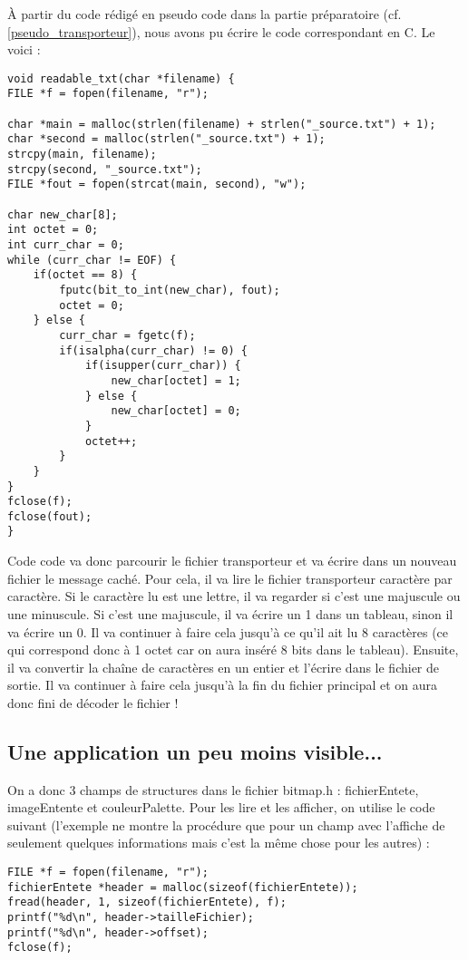 \documentclass[12pt]{article}
\begin{document}
À partir du code rédigé en pseudo code dans la partie préparatoire (cf. \ref{pseudo_transporteur}), nous avons pu écrire le code correspondant en C. Le voici :
\begin{lstlisting}[style=languageClarge, caption=Code décodage fichier txt]
void readable_txt(char *filename) {
FILE *f = fopen(filename, "r");

char *main = malloc(strlen(filename) + strlen("_source.txt") + 1);
char *second = malloc(strlen("_source.txt") + 1);
strcpy(main, filename);
strcpy(second, "_source.txt");
FILE *fout = fopen(strcat(main, second), "w");

char new_char[8];
int octet = 0;
int curr_char = 0;
while (curr_char != EOF) {
    if(octet == 8) {
        fputc(bit_to_int(new_char), fout);
        octet = 0;
    } else {
        curr_char = fgetc(f);
        if(isalpha(curr_char) != 0) {
            if(isupper(curr_char)) {
                new_char[octet] = 1;
            } else {
                new_char[octet] = 0;
            }
            octet++;
        }
    }
}
fclose(f);
fclose(fout);
}
\end{lstlisting}
Code code va donc parcourir le fichier transporteur et va écrire dans un nouveau fichier le message caché. Pour cela, il va lire le fichier transporteur caractère par caractère. Si le caractère lu est une lettre, il va regarder si c'est une majuscule ou une minuscule. Si c'est une majuscule, il va écrire un 1 dans un tableau, sinon il va écrire un 0. Il va continuer à faire cela jusqu'à ce qu'il ait lu 8 caractères (ce qui correspond donc à 1 octet car on aura inséré 8 bits dans le tableau). Ensuite, il va convertir la chaîne de caractères en un entier et l'écrire dans le fichier de sortie. Il va continuer à faire cela jusqu'à la fin du fichier principal et on aura donc fini de décoder le fichier !

\subsection{Une application un peu moins visible...}
On a donc 3 champs de structures dans le fichier bitmap.h : fichierEntete, imageEntente et couleurPalette.
Pour les lire et les afficher, on utilise le code suivant (l'exemple ne montre la procédure que pour un champ avec l'affiche de seulement quelques informations mais c'est la même chose pour les autres) :
\begin{lstlisting}[style=languageClarge, caption=Code pour lire un champ de la structure bitmap]
FILE *f = fopen(filename, "r");
fichierEntete *header = malloc(sizeof(fichierEntete));
fread(header, 1, sizeof(fichierEntete), f);
printf("%d\n", header->tailleFichier);
printf("%d\n", header->offset);
fclose(f);
\end{lstlisting}
\end{document}
